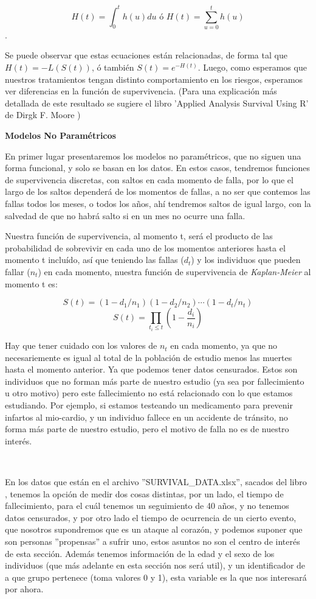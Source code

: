 \documentclass[12pt]{article}
\begin{document}
$$H(t) = \int_{0}^{t}h(u)du  \text{  ó  } H(t)=\sum_{u=0}^{t} h(u)$$.

Se puede observar que estas ecuaciones están relacionadas, de forma tal que $H(t)=-L(S(t))$, ó también $S(t) = e^{-H(t)}$. Luego, como esperamos que nuestros tratamientos tengan distinto comportamiento en los riesgos, esperamos ver diferencias en la función de supervivencia. (Para una explicación más detallada de este resultado se sugiere el libro 'Applied Analysis Survival Using R' de Dirgk F. Moore \cite{moore_applied_2016})

\begin{center}
    \textbf{Modelos No Paramétricos}
\end{center}

En primer lugar presentaremos los modelos no paramétricos, que no siguen una forma funcional, y solo se basan en los datos. En estos casos, tendremos funciones de supervivencia discretas, con saltos en cada momento de falla, por lo que el largo de los saltos dependerá de los momentos de fallas, a no ser que contemos las fallas todos los meses, o todos los años, ahí tendremos saltos de igual largo, con la salvedad de que no habrá salto si en un mes no ocurre una falla.\

Nuestra función de supervivencia, al momento t, será el producto de las probabilidad de sobrevivir en cada uno de los momentos anteriores hasta el momento t incluído, así que teniendo las fallas ($d_t$) y los individuos que pueden fallar ($n_t$) en cada momento, nuestra función de supervivencia de \textit{Kaplan-Meier} al momento t es:

$$S(t)=(1-d_1/n_1)(1-d_2/n_2) \dotsb (1-d_t/n_t)$$
$$S(t) = \prod_{t_i\leq t} (1-\frac{d_i}{n_i})$$

Hay que tener cuidado con los valores de $n_t$ en cada momento, ya que no necesariemente es igual al total de la población de estudio menos las muertes hasta el momento anterior. Ya que podemos tener datos censurados. Estos son individuos que no forman más parte de nuestro estudio (ya sea por fallecimiento u otro motivo) pero este fallecimiento no está relacionado con lo que estamos estudiando. Por ejemplo, si estamos testeando un medicamento para prevenir infartos al mio-cardio, y un individuo fallece en un accidente de tránsito, no forma más parte de nuestro estudio, pero el motivo de falla no es de nuestro interés.

\

En los datos que están en el archivo ''SURVIVAL\_DATA.xlsx'', sacados del libro \cite{gray_applied_2011}, tenemos la opción de medir dos cosas distintas, por un lado, el tiempo de fallecimiento, para el cuál tenemos un seguimiento de 40 años, y no tenemos datos censurados, y por otro lado el tiempo de ocurrencia de un cierto evento, que nosotros supondremos que es un ataque al corazón, y podemos suponer que son personas ''propensas'' a sufrir uno, estos asuntos no son el centro de interés de esta sección. Además tenemos información de la edad y el sexo de los individuos (que más adelante en esta sección nos será util), y un identificador de a que grupo pertenece (toma valores 0 y 1), esta variable es la que nos interesará por ahora.\
\end{document}

